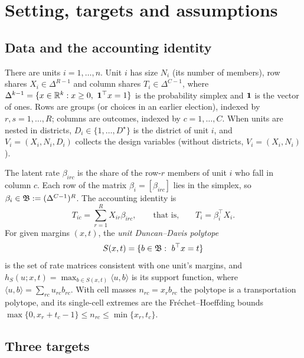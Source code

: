 \section{Setting, targets and assumptions}\label{sec:setting}

\subsection{Data and the accounting identity}

There are units $i=1,\dots,n$. Unit $i$ has size $N_i$ (its number of
members), row shares $X_i\in\Delta^{R-1}$ and column shares
$T_i\in\Delta^{C-1}$, where $\Delta^{k-1}=\{x\in\R^k:x\ge0,\ \one^\top x=1\}$
is the probability simplex and $\mathbf 1$ is the vector of ones. Rows are groups
(or choices in an earlier election), indexed by $r,s=1,\dots,R$; columns are
outcomes, indexed by $c=1,\dots,C$. When units are nested in districts,
$D_i\in\{1,\dots,D^\star\}$ is the district of unit $i$, and $V_i=(X_i,N_i,D_i)$
collects the design variables (without districts, $V_i=(X_i,N_i)$).

The latent rate $\beta_{irc}$ is the share of the row-$r$ members of unit $i$ who
fall in column $c$. Each row of the matrix $\beta_i=[\beta_{irc}]$ lies in the
simplex, so $\beta_i\in\mathfrak B:=(\Delta^{C-1})^R$. The accounting identity is
\begin{equation}\label{eq:acc}
T_{ic}=\sum_{r=1}^R X_{ir}\beta_{irc},\qquad\text{that is,}\qquad T_i=\beta_i^\top X_i .
\end{equation}
For given margins $(x,t)$, the \emph{unit Duncan--Davis polytope}
\[
S(x,t)=\{b\in\mathfrak B:\ b^\top x=t\}
\]
is the set of rate matrices consistent with one unit's margins, and
$h_S(u;x,t)=\max_{b\in S(x,t)}\langle u,b\rangle$ is its support function, where
$\langle u,b\rangle=\sum_{rc}u_{rc}b_{rc}$. With cell masses $n_{rc}=x_rb_{rc}$
the polytope is a transportation polytope, and its single-cell extremes are the
Fréchet--Hoeffding bounds $\max\{0,x_r+t_c-1\}\le n_{rc}\le\min\{x_r,t_c\}$.

\subsection{Three targets}\label{sec:targets}

